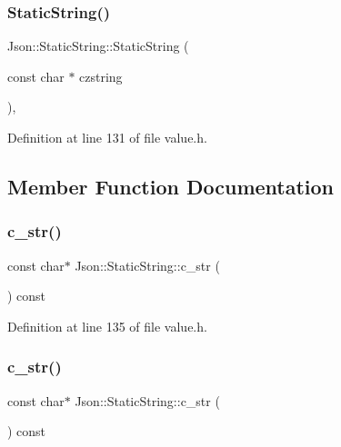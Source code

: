 \subsubsection{\texorpdfstring{Static\+String()}{StaticString()}\hspace{0.1cm}{\footnotesize\ttfamily [2/2]}}
{\footnotesize\ttfamily Json\+::\+Static\+String\+::\+Static\+String (\begin{DoxyParamCaption}\item[{const char $\ast$}]{czstring }\end{DoxyParamCaption})\hspace{0.3cm}{\ttfamily [inline]}, {\ttfamily [explicit]}}



Definition at line 131 of file value.\+h.



\subsection{Member Function Documentation}
\hypertarget{class_json_1_1_static_string_ad6be703d432d108623bb0aa06b0b90ca}{}\label{class_json_1_1_static_string_ad6be703d432d108623bb0aa06b0b90ca} 
\subsubsection{\texorpdfstring{c\+\_\+str()}{c\_str()}\hspace{0.1cm}{\footnotesize\ttfamily [1/2]}}
{\footnotesize\ttfamily const char$\ast$ Json\+::\+Static\+String\+::c\+\_\+str (\begin{DoxyParamCaption}{ }\end{DoxyParamCaption}) const\hspace{0.3cm}{\ttfamily [inline]}}



Definition at line 135 of file value.\+h.

\hypertarget{class_json_1_1_static_string_ad6be703d432d108623bb0aa06b0b90ca}{}\label{class_json_1_1_static_string_ad6be703d432d108623bb0aa06b0b90ca} 
\subsubsection{\texorpdfstring{c\+\_\+str()}{c\_str()}\hspace{0.1cm}{\footnotesize\ttfamily [2/2]}}
{\footnotesize\ttfamily const char$\ast$ Json\+::\+Static\+String\+::c\+\_\+str (\begin{DoxyParamCaption}{ }\end{DoxyParamCaption}) const\hspace{0.3cm}{\ttfamily [inline]}}



